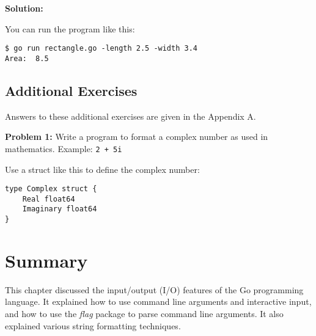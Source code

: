 \textbf{Solution:}



You can run the program like this:

\begin{lstlisting}[numbers=none]
$ go run rectangle.go -length 2.5 -width 3.4
Area:  8.5
\end{lstlisting}

\subsection{Additional Exercises}

Answers to these additional exercises are given in the Appendix A.

\textbf{Problem 1:} Write a program to format a complex number as used in mathematics.  Example: \texttt{2 + 5i}

Use a struct like this to define the complex number:

\begin{lstlisting}[numbers=none]
type Complex struct {
    Real float64
    Imaginary float64
}
\end{lstlisting}


\section*{Summary}

This chapter discussed the input/output (I/O) features of the Go programming
language. It explained how to use command line arguments and interactive input,
and how to use the \textit{flag} package to parse command line arguments. It
also explained various string formatting techniques.
